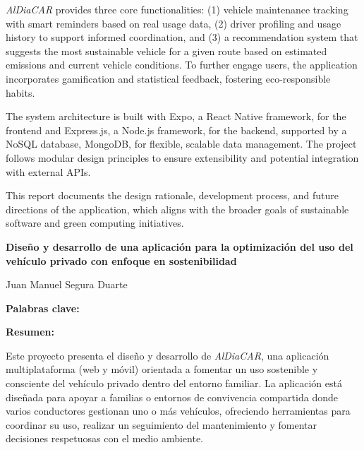 \textit{AlDiaCAR} provides three core functionalities: (1) vehicle maintenance tracking with smart reminders based on real usage data, (2) driver profiling and usage history to support informed coordination, and (3) a recommendation system that suggests the most sustainable vehicle for a given route based on estimated emissions and current vehicle conditions. To further engage users, the application incorporates gamification and statistical feedback, fostering eco-responsible habits.

\textgap

The system architecture is built with Expo, a React Native framework, for the frontend and Express.js, a Node.js framework, for the backend, supported by a NoSQL database, MongoDB, for flexible, scalable data management. The project follows modular design principles to ensure extensibility and potential integration with external APIs.

\textgap

This report documents the design rationale, development process, and future directions of the application, which aligns with the broader goals of sustainable software and green computing initiatives.


\clearpage
\mbox{}
\newpage


\begin{center}
    {\large\bfseries Diseño y desarrollo de una aplicación para la optimización del uso del vehículo privado con enfoque en sostenibilidad}
\end{center}
\begin{center}
    Juan Manuel Segura Duarte
\end{center}

\begin{flushleft}
    \textbf{Palabras clave:}
\end{flushleft}

\begin{flushleft}
    \textbf{Resumen:}
\end{flushleft}

Este proyecto presenta el diseño y desarrollo de \textit{AlDiaCAR}, una aplicación multiplataforma (web y móvil) orientada a fomentar un uso sostenible y consciente del vehículo privado dentro del entorno familiar. La aplicación está diseñada para apoyar a familias o entornos de convivencia compartida donde varios conductores gestionan uno o más vehículos, ofreciendo herramientas para coordinar su uso, realizar un seguimiento del mantenimiento y fomentar decisiones respetuosas con el medio ambiente.


